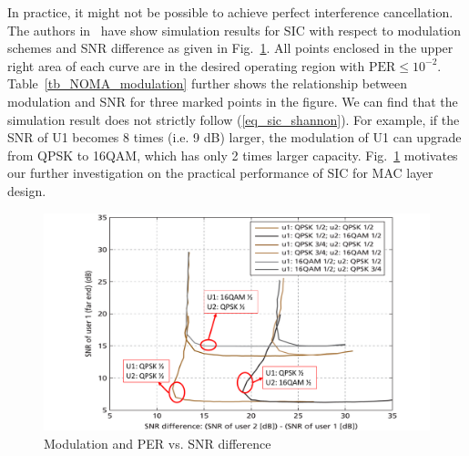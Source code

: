 
In practice, it might not be possible to achieve perfect interference cancellation.
The authors in~\cite{cite_bell1} have show simulation results for SIC with respect to modulation schemes and SNR difference as given in Fig.~\ref{fig_NOMA_modulation}. All points enclosed in the upper right area of each curve are in the desired operating region with $\text{PER} \leq 10^{-2}.$  
Table~\ref{tb_NOMA_modulation} further shows the relationship between modulation and SNR for three marked points in the figure. We can find that the simulation result does not strictly follow (\ref{eq_sic_shannon}). For example, if the SNR of U1 becomes 8 times (i.e. 9 dB) larger, the modulation of U1 can upgrade from QPSK to 16QAM, which has only 2 times larger capacity. 
%
Fig.~\ref{fig_NOMA_modulation} motivates our further investigation on the practical performance of SIC for MAC layer design.


\begin{figure}[t]
\begin{center}
\includegraphics[width=1\columnwidth ,angle=0]{figure/NOMA_modulation}
\caption{Modulation and PER vs. SNR difference}
\label{fig_NOMA_modulation}
\end{center}
\end{figure}
%

